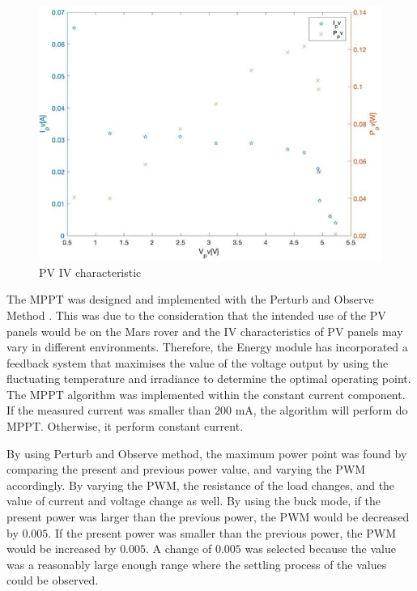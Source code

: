 \documentclass[11pt, a4paper]{article}
\begin{document}
\begin{figure} [h!]
    \centering
    \includegraphics[scale=0.6]{Energy_PV_characteristic.JPG}
    \caption{PV IV characteristic}
    \label{fig:IV_char}
\end{figure}

The MPPT was designed and implemented with the Perturb and Observe Method \cite{PV_current}. This was due to the consideration that the intended use of the PV panels would be on the Mars rover and the IV characteristics of PV panels may vary in different environments. Therefore, the Energy module has incorporated a feedback system that maximises the value of the voltage output by using the fluctuating temperature and irradiance to determine the optimal operating point. The MPPT algorithm was implemented within the constant current component. If the measured current was smaller than $200$ mA, the algorithm will perform do MPPT. Otherwise, it perform constant current.

By using Perturb and Observe method, the maximum power point was found by comparing the present and previous power value, and varying the PWM accordingly. By varying the PWM, the resistance of the load changes, and the value of current and voltage change as well. By using the buck mode, if the present power was larger than the previous power, the PWM would be decreased by $0.005$. If the present power was smaller than the previous power, the PWM would be increased by $0.005$. A change of $0.005$ was selected because the value was a reasonably large enough range where the settling process of the values could be observed.

\pagebreak
\end{document}
